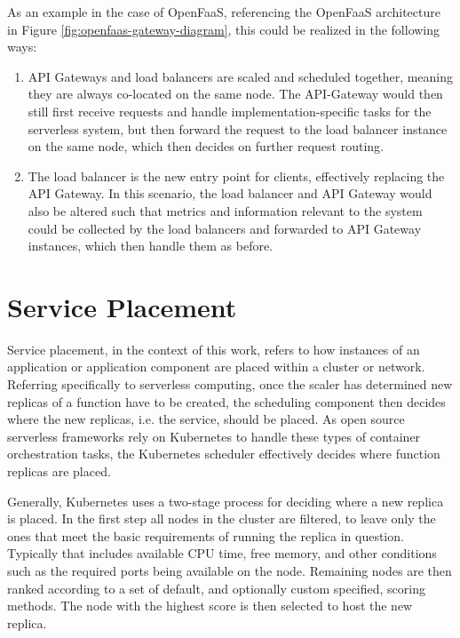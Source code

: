 \documentclass[draft,final]{vutinfth} %
\begin{document}
As an example in the case of OpenFaaS, referencing the OpenFaaS architecture in Figure \ref{fig:openfaas-gateway-diagram}, this could be realized in the following ways:
\begin{enumerate}
    \item API Gateways and load balancers are scaled and scheduled together, meaning they are always co-located on the same node. The API-Gateway would then still first receive requests and handle implementation-specific tasks for the serverless system, but then forward the request to the load balancer instance on the same node, which then decides on further request routing.
    \item The load balancer is the new entry point for clients, effectively replacing the API Gateway. In this scenario, the load balancer and API Gateway would also be altered such that metrics and information relevant to the system could be collected by the load balancers and forwarded to API Gateway instances, which then handle them as before.
\end{enumerate}
\section{Service Placement}
Service placement, in the context of this work, refers to how instances of an application or application component are placed within a cluster or network.
Referring specifically to serverless computing, once the scaler has determined new replicas of a function have to be created, the scheduling component then decides where the new replicas, i.e. the service, should be placed.
As open source serverless frameworks rely on Kubernetes to handle these types of container orchestration tasks\cite{mohantyEvaluationOpenSource2018}, the Kubernetes scheduler effectively decides where function replicas are placed.

Generally, Kubernetes uses a two-stage process for deciding where a new replica is placed.
In the first step all nodes in the cluster are filtered, to leave only the ones that meet the basic requirements of running the replica in question.
Typically that includes available CPU time, free memory, and other conditions such as the required ports being available on the node.
Remaining nodes are then ranked according to a set of default, and optionally custom specified, scoring methods.
The node with the highest score is then selected to host the new replica.
\end{document}
